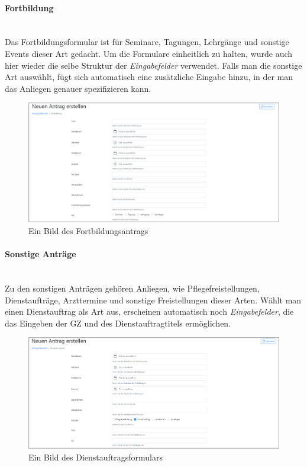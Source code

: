 \paragraph{Fortbildung}
~\\
Das Fortbildungsformular ist für Seminare, Tagungen, Lehrgänge und sonstige Events dieser Art gedacht. Um die Formulare einheitlich zu halten, wurde auch hier wieder die selbe Struktur der \textit{Eingabefelder} verwendet. Falls man die sonstige Art auswählt, fügt sich automatisch eine zusätzliche Eingabe hinzu, in der man das Anliegen genauer spezifizieren kann.
\begin{figure}[H]
	\centering
	\includegraphics[width=1\linewidth]{images/ldehner_implementierung/fortbildung_1}
	\caption[Fortbildungsantrag]{Ein Bild des Fortbildungsantrags}
	\label{fig:frotbildung}
\end{figure}

\paragraph{Sonstige Anträge}
~\\
Zu den sonstigen Anträgen gehören Anliegen, wie Pflegefreistellungen, Dienstaufträge, Arzttermine und sonstige Freistellungen dieser Arten. Wählt man einen Dienstauftrag als Art aus, erscheinen automatisch noch \textit{Eingabefelder}, die das Eingeben der GZ und des Dienstauftragtitels ermöglichen.
\begin{figure}[H]
	\centering
	\includegraphics[width=1\linewidth]{images/ldehner_implementierung/dienstauftrag}
	\caption[Dienstreiseauftrag]{Ein Bild des Dienstauftragsformulars}
	\label{fig:dienst}
\end{figure}
\newpage
